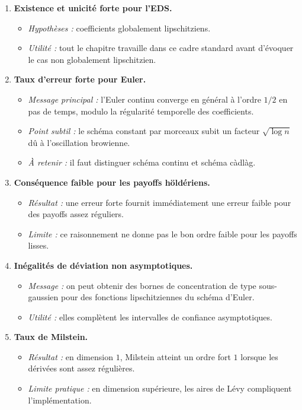 \documentclass[11pt,a4paper]{article}
\begin{document}
\begin{enumerate}[label=\textbf{\arabic*.}]
  \item \textbf{Existence et unicité forte pour l'EDS.}
  \begin{itemize}
    \item \emph{Hypothèses :} coefficients globalement lipschitziens.
    \item \emph{Utilité :} tout le chapitre travaille dans ce cadre standard avant d'évoquer le cas non globalement lipschitzien.
  \end{itemize}

  \item \textbf{Taux d'erreur forte pour Euler.}
  \begin{itemize}
    \item \emph{Message principal :} l'Euler continu converge en général à l'ordre $1/2$ en pas de temps, modulo la régularité temporelle des coefficients.
    \item \emph{Point subtil :} le schéma constant par morceaux subit un facteur $\sqrt{\log n}$ dû à l'oscillation browienne.
    \item \emph{À retenir :} il faut distinguer schéma continu et schéma càdlàg.
  \end{itemize}

  \item \textbf{Conséquence faible pour les payoffs höldériens.}
  \begin{itemize}
    \item \emph{Résultat :} une erreur forte fournit immédiatement une erreur faible pour des payoffs assez réguliers.
    \item \emph{Limite :} ce raisonnement ne donne pas le bon ordre faible pour les payoffs lisses.
  \end{itemize}

  \item \textbf{Inégalités de déviation non asymptotiques.}
  \begin{itemize}
    \item \emph{Message :} on peut obtenir des bornes de concentration de type sous-gaussien pour des fonctions lipschitziennes du schéma d'Euler.
    \item \emph{Utilité :} elles complètent les intervalles de confiance asymptotiques.
  \end{itemize}

  \item \textbf{Taux de Milstein.}
  \begin{itemize}
    \item \emph{Résultat :} en dimension $1$, Milstein atteint un ordre fort $1$ lorsque les dérivées sont assez régulières.
    \item \emph{Limite pratique :} en dimension supérieure, les aires de Lévy compliquent l'implémentation.
  \end{itemize}


\end{enumerate}
\end{document}
